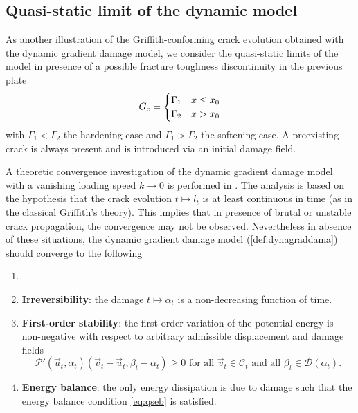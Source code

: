 \subsection{Quasi-static limit of the dynamic model}
As another illustration of the Griffith-conforming crack evolution obtained with the dynamic gradient damage model, we consider the quasi-static limits of the model in presence of a possible fracture toughness discontinuity in the previous plate
\[
G_\mathrm{c}=\begin{cases}
\Gamma_1 & x\leq x_0 \\
\Gamma_2 & x>x_0
\end{cases}
\]
with $\Gamma_1<\Gamma_2$ the hardening case and $\Gamma_1>\Gamma_2$ the softening case. A preexisting crack is always present and is introduced via an initial damage field.

A theoretic convergence investigation of the dynamic gradient damage model with a vanishing loading speed $k\to 0$ is performed in \cite{Versieux:2015}. The analysis is based on the hypothesis that the crack evolution $t\mapsto l_t$ is at least continuous in time (as in the classical Griffith's theory). This implies that in presence of brutal or unstable crack propagation, the convergence may not be observed. Nevertheless in absence of these situations, the dynamic gradient damage model (\cref{def:dynagraddama}) should converge to the following
\begin{definition} \label{def:firstorderqs}
\begin{enumerate}
\item[]
\item \textbf{Irreversibility}: the damage $t\mapsto\alpha_t$ is a non-decreasing function of time.

\item \textbf{First-order stability}: the first-order variation of the potential energy is non-negative with respect to arbitrary admissible displacement and damage fields
\begin{equation} \label{eq:viqs}
\mathcal{P}'(\vec{u}_t,\alpha_t)(\vec{v}_t-\vec{u}_t,\beta_t-\alpha_t)\geq 0\text{ for all $\vec{v}_t\in\mathcal{C}_t$ and all $\beta_t\in\mathcal{D}(\alpha_t)$}.
\end{equation}

\item \textbf{Energy balance}: the only energy dissipation is due to damage such that the energy balance condition \eqref{eq:qseb} is satisfied.
\end{enumerate}
\end{definition}

